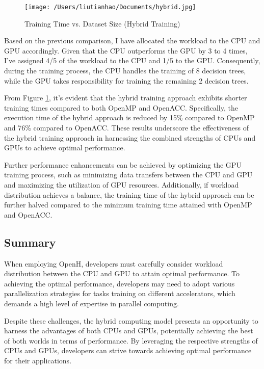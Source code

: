 \documentclass[13pt]{article}
\begin{document}
\begin{figure}[h!]
    \centering
    \texttt{[image: /Users/liutianhao/Documents/hybrid.jpg]}
    \caption{Training Time vs. Dataset Size (Hybrid Training)}
    \label{fig:dataset2}    
\end{figure}

Based on the previous comparison, I have allocated the workload to the CPU and GPU accordingly. Given that the CPU outperforms the GPU by 3 to 4 times, I've assigned 4/5 of the workload to the CPU and 1/5 to the GPU. Consequently, during the training process, the CPU handles the training of 8 decision trees, while the GPU takes responsibility for training the remaining 2 decision trees.

From Figure \ref{fig:dataset2}, it's evident that the hybrid training approach exhibits shorter training times compared to both OpenMP and OpenACC. Specifically, the execution time of the hybrid approach is reduced by 15\% compared to OpenMP and 76\% compared to OpenACC. These results underscore the effectiveness of the hybrid training approach in harnessing the combined strengths of CPUs and GPUs to achieve optimal performance.

Further performance enhancements can be achieved by optimizing the GPU training process, such as minimizing data transfers between the CPU and GPU and maximizing the utilization of GPU resources. Additionally, if workload distribution achieves a balance, the training time of the hybrid approach can be further halved compared to the minimum training time attained with OpenMP and OpenACC.

\subsection{Summary}
When employing OpenH, developers must carefully consider workload distribution between the CPU and GPU to attain optimal performance. To achieving the optimal performance, developers may need to adopt various parallelization strategies for tasks training on different accelerators, which demands a high level of expertise in parallel computing. 

Despite these challenges, the hybrid computing model presents an opportunity to harness the advantages of both CPUs and GPUs, potentially achieving the best of both worlds in terms of performance. By leveraging the respective strengths of CPUs and GPUs, developers can strive towards achieving optimal performance for their applications.
\end{document}
